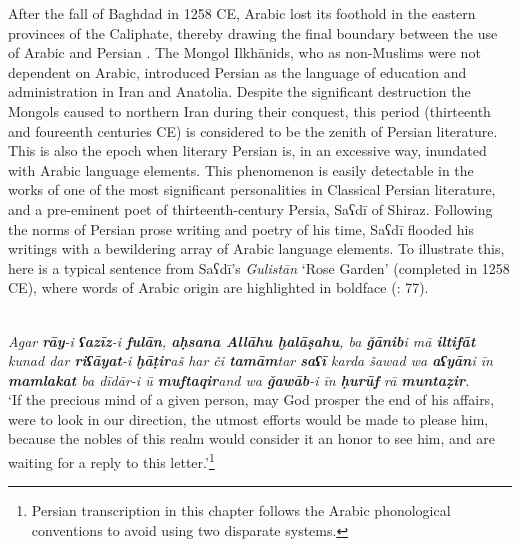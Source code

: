 \documentclass[output=paper]{langsci/langscibook}
\begin{document}
After the fall of Baghdad in 1258 CE, Arabic lost its foothold in the eastern provinces of the Caliphate, thereby drawing the final boundary between the use of Arabic and Persian \citep{Danner2000}. The Mongol Ilkhānids, who as non-Muslims were not dependent on Arabic, introduced Persian as the language of education and administration in Iran and Anatolia. Despite the significant destruction the Mongols caused to northern Iran during their conquest, this period (thirteenth and foureenth centuries CE) is considered to be the zenith of Persian literature. This is also the epoch when literary Persian is, in an excessive way, inundated with Arabic language elements. This phenomenon is easily detectable in the works of one of the most significant personalities in Classical Persian literature, and a pre-eminent poet of thirteenth-century Persia, Saʕdī of Shiraz. Following the norms of Persian prose writing and poetry of his time, Saʕdī flooded his writings with a bewildering array of Arabic language elements. To illustrate this, here is a typical sentence from Saʕdī’s \textit{Gulistān} ‘Rose Garden’ (completed in 1258 CE), where words of Arabic origin are highlighted in boldface (\citealt{Yūsifī2004}: 77).


\ea
{}\\
{\itshape Agar \textbf{rāy}-i \textbf{ʕazīz}-i \textbf{fulān}, \textbf{aḥsana Allāhu ḫalāṣahu}, ba \textbf{ǧānib}i mā \textbf{iltifāt} kunad dar \textbf{riʕāyat}-i \textbf{ḫāṭir}aš har či \textbf{tamām}tar \textbf{saʕī}  karda  šawad wa \textbf{aʕyān}i īn \textbf{mamlakat} ba dīdār-i ū \textbf{muftaqir}and wa \textbf{ǧawāb}-i īn \textbf{ḥurūf} rā \textbf{muntaẓir}.}\\
\glt ‘If the precious mind of a given person, may God prosper the end of his affairs, were to look in our direction, the utmost efforts would be made to please him, because the nobles of this realm would consider it an honor to see him, and are waiting for a reply to this letter.’\footnote{Persian transcription in this chapter follows the Arabic phonological conventions to avoid using two disparate systems.}
\z
\end{document}
